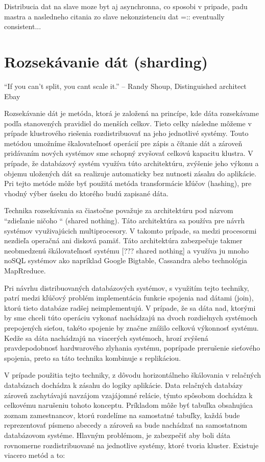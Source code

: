 \documentclass[11pt,twoside,a4paper]{book}
\begin{document}
Distribucia dat na slave moze byt aj asynchronna, co sposobi v pripade, padu mastra a nasledneho citania zo slave nekonzistenciu dat =:: eventually consistent...



\section{Rozsekávanie dát (sharding)}
“If you can’t split, you cant scale it.” -- Randy Shoup, Distinguished architect Ebay

Rozsekávanie dát je metóda, ktorá je založená na princípe, kde dáta rozsekávame podľa stanovených pravidiel do menších celkov. Tieto celky následne môžeme v prípade klustrového riešenia rozdistribuovať na jeho jednotlivé systémy. Touto metódou umožníme škalovateľnosť operácií pre zápis a čítanie dát a zároveň pridávaním nových systémov sme schopný zvyšovať celkovú kapacitu klustra. V prípade, že databázový systém využíva túto architektúru, zvýšenie jeho výkonu a objemu uložených dát sa realizuje automaticky bez nutnosti zásahu do aplikácie. Pri tejto metóde môže byť použitá metóda transformácie kľúčov (hashing), pre vhodný výber úseku do ktorého budú zapisané dáta.

Technika rozsekávania sa čiastočne považuje za architektúru pod názvom “zdieľanie ničoho “ (shared nothing). Táto architektúra sa používa pre návrh systémov využivajúcich multiprocesory. V takomto prípade, sa medzi procesormi nezdieľa operačná ani disková pamäť. Táto architektúra zabezpečuje takmer neobmedzenú škálovateľnosť systému [??? shared nothing] a využíva ju mnoho noSQL systémov ako napríklad Google Bigtable, Cassandra alebo technológia MapRreduce.

Pri návrhu distribuovaných databázových systémov, s využitím tejto techniky, patrí medzi kľúčový problém implementácia funkcie spojenia nad dátami (join), ktorú tieto databáze radšej neimplementujú. V prípade, že sa dáta nad, ktorými by sme chceli túto operáciu vykonať nachádzajú na dvoch rozdielnych systémoch prepojených sieťou, takéto spojenie by značne znížilo celkovú výkonnosť systému. Kedže sa dáta nachádzajú na viacerých systémoch, hrozí zvýšená pravdepodobnosť hardwarového zlyhania systému, poprípade prerušenie sieťového spojenia, preto sa táto technika kombinuje s replikáciou.

V prípade použitia tejto techniky, z dôvodu horizontálneho škálovania v relačných databázach dochádza k zásahu do logiky aplikácie. Data relačných databázy zároveň zachytávajú navzájom vzajájomné relácie, týmto spôsobom dochádza k celkovému narušeniu tohoto konceptu. Príkladom môže byť tabuľka obsahujúca zoznam zamestnancov, ktorú rozdelíme na samostatné tabuľky, každá bude reprezentovať písmeno abecedy a zároveň sa bude nachádzať na samostatnom databázovom systéme. Hlavným problémom, je zabezpečiť aby boli dáta rovnomerne rozdistribuované na jednotlive systémy, ktoré tvoria kluster. Existuje viacero metód a to:
\end{document}

